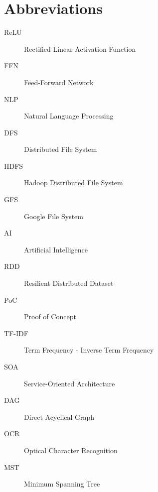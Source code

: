 \documentclass[\main/main.tex]{subfiles}
\begin{document}
\chapter*{Abbreviations}

\begin{description}
    \item[ReLU] Rectified Linear Activation Function
    \item[FFN] Feed-Forward Network
    \item[NLP] Natural Language Processing
    \item[DFS] Distributed File System
    \item[HDFS] Hadoop Distributed File System
    \item[GFS] Google File System
    \item[AI] Artificial Intelligence
    \item[RDD] Resilient Distributed Dataset
    \item[PoC] Proof of Concept
    \item[TF-IDF] Term Frequency - Inverse Term Frequency
    \item[SOA] Service-Oriented Architecture
    \item[DAG] Direct Acyclical Graph
    \item[OCR] Optical Character Recognition
    \item[MST] Minimum Spanning Tree
\end{description}
\end{document}
